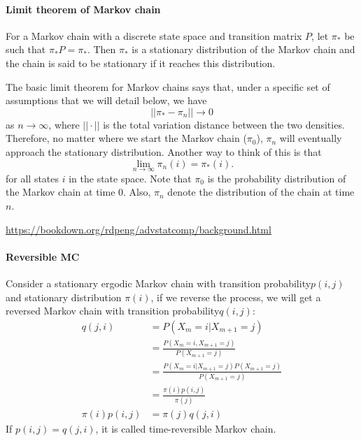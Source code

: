 \paragraph{Limit theorem of Markov chain}

For a Markov chain with a discrete state space and transition matrix $P$, let $\pi_*$ be such that $\pi_*P=\pi_*$. Then $\pi_*$ is a stationary distribution of the Markov chain and the chain is said to be stationary if it reaches this distribution.

The basic limit theorem for Markov chains says that, under a specific set of assumptions that we will detail below, we have 
$$||\pi_*-\pi_n|| \to 0$$
as $n\to\infty$, where $||\cdot||$ is the total variation distance between the two densities. Therefore, no matter where we start the Markov chain ($\pi_0$), $\pi_n$ will eventually approach the stationary distribution. Another way to think of this is that 
$$\lim_{n\to\infty}\pi_n(i)=\pi_*(i).$$
for all states $i$ in the state space. Note that $\pi_0$ is the probability distribution of the Markov chain at time 0. Also, $\pi_n$ denote the distribution of the chain at time $n$.

\url{https://bookdown.org/rdpeng/advstatcomp/background.html}


\paragraph{Reversible MC}
Consider a stationary ergodic Markov chain with transition probability$p(i, j)$ and stationary distribution $\pi(i)$, if we reverse the process, we will get a reversed Markov chain with transition probability$q(i, j)$: 
\begin{align*}
	q(j,i) &= P(X_m=i|X_{m+1}=j)\\
		   &= \frac{P(X_m=i,X_{m+1}=j)}{P(X_{m+1}=j)}\\
		   &= \frac{P(X_m=i|X_{m+1}=j)P(X_{m+1}=j)}{P(X_{m+1}=j)}\\
		   &= \frac{\pi(i)p(i,j)}{\pi(j)}\\
	\pi(i)p(i,j) &= \pi(j)q(j,i)
\end{align*}
If $p(i,j) = q(j,i)$, it is called time-reversible Markov chain. 


